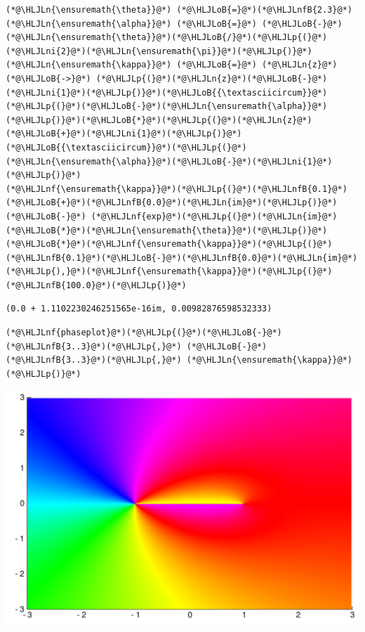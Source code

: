 \documentclass[12pt,a4paper]{article}
\newcommand{\HLJLn}[1]{#1}
\newcommand{\HLJLnf}[1]{\textcolor[RGB]{66,102,213}{#1}}
\newcommand{\HLJLnfB}[1]{\textcolor[RGB]{59,151,46}{#1}}
\newcommand{\HLJLni}[1]{\textcolor[RGB]{59,151,46}{#1}}
\newcommand{\HLJLoB}[1]{\textcolor[RGB]{102,102,102}{\textbf{#1}}}
\newcommand{\HLJLp}[1]{#1}
\begin{document}
\begin{lstlisting}
(*@\HLJLn{\ensuremath{\theta}}@*) (*@\HLJLoB{=}@*)(*@\HLJLnfB{2.3}@*)
(*@\HLJLn{\ensuremath{\alpha}}@*) (*@\HLJLoB{=}@*) (*@\HLJLoB{-}@*)(*@\HLJLn{\ensuremath{\theta}}@*)(*@\HLJLoB{/}@*)(*@\HLJLp{(}@*)(*@\HLJLni{2}@*)(*@\HLJLn{\ensuremath{\pi}}@*)(*@\HLJLp{)}@*)
(*@\HLJLn{\ensuremath{\kappa}}@*) (*@\HLJLoB{=}@*) (*@\HLJLn{z}@*) (*@\HLJLoB{->}@*) (*@\HLJLp{(}@*)(*@\HLJLn{z}@*)(*@\HLJLoB{-}@*)(*@\HLJLni{1}@*)(*@\HLJLp{)}@*)(*@\HLJLoB{{\textasciicircum}}@*)(*@\HLJLp{(}@*)(*@\HLJLoB{-}@*)(*@\HLJLn{\ensuremath{\alpha}}@*)(*@\HLJLp{)}@*)(*@\HLJLoB{*}@*)(*@\HLJLp{(}@*)(*@\HLJLn{z}@*)(*@\HLJLoB{+}@*)(*@\HLJLni{1}@*)(*@\HLJLp{)}@*)(*@\HLJLoB{{\textasciicircum}}@*)(*@\HLJLp{(}@*)(*@\HLJLn{\ensuremath{\alpha}}@*)(*@\HLJLoB{-}@*)(*@\HLJLni{1}@*)(*@\HLJLp{)}@*)
(*@\HLJLnf{\ensuremath{\kappa}}@*)(*@\HLJLp{(}@*)(*@\HLJLnfB{0.1}@*)(*@\HLJLoB{+}@*)(*@\HLJLnfB{0.0}@*)(*@\HLJLn{im}@*)(*@\HLJLp{)}@*) (*@\HLJLoB{-}@*) (*@\HLJLnf{exp}@*)(*@\HLJLp{(}@*)(*@\HLJLn{im}@*)(*@\HLJLoB{*}@*)(*@\HLJLn{\ensuremath{\theta}}@*)(*@\HLJLp{)}@*)(*@\HLJLoB{*}@*)(*@\HLJLnf{\ensuremath{\kappa}}@*)(*@\HLJLp{(}@*)(*@\HLJLnfB{0.1}@*)(*@\HLJLoB{-}@*)(*@\HLJLnfB{0.0}@*)(*@\HLJLn{im}@*)(*@\HLJLp{),}@*)(*@\HLJLnf{\ensuremath{\kappa}}@*)(*@\HLJLp{(}@*)(*@\HLJLnfB{100.0}@*)(*@\HLJLp{)}@*)
\end{lstlisting}

\begin{lstlisting}
(0.0 + 1.1102230246251565e-16im, 0.00982876598532333)
\end{lstlisting}


\begin{lstlisting}
(*@\HLJLnf{phaseplot}@*)(*@\HLJLp{(}@*)(*@\HLJLoB{-}@*)(*@\HLJLnfB{3..3}@*)(*@\HLJLp{,}@*) (*@\HLJLoB{-}@*)(*@\HLJLnfB{3..3}@*)(*@\HLJLp{,}@*) (*@\HLJLn{\ensuremath{\kappa}}@*)(*@\HLJLp{)}@*)
\end{lstlisting}

\includegraphics[width=\linewidth]{figures/Solutions2_29_1.pdf}
\end{document}
